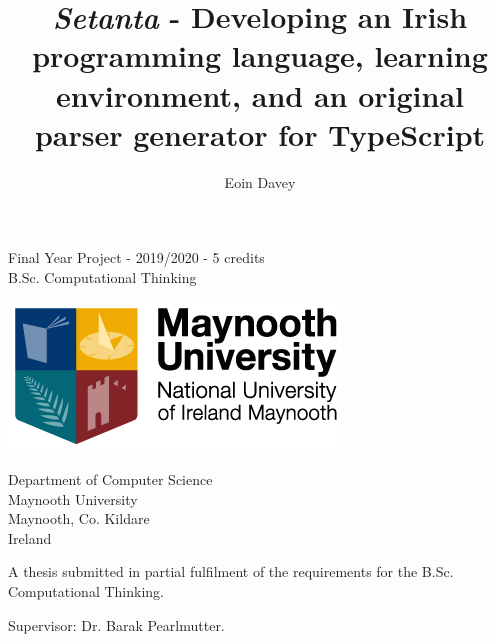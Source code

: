 \documentclass[11pt]{extarticle}
\newcommand{\Setanta}{\emph{Setanta}}
\begin{document}
    \title{
    \LARGE \textbf{\Setanta{} - Developing an Irish programming language, learning environment, and an original parser generator for TypeScript}\\
    }
    \author{\LARGE Eoin Davey}
    \date{}
    
    \maketitle

    \begin{center}
        \begin{LARGE}
        Final Year Project - 2019/2020 - 5 credits\\
        B.Sc. Computational Thinking\\

        \vspace{10mm}

        \includegraphics[scale=0.66]{src/maynoothlogo}

        \vspace{25mm}

        Department of Computer Science\\
        Maynooth University\\
        Maynooth, Co. Kildare\\
        Ireland
        \end{LARGE}

        \vspace{20mm}

        \begin{large}A thesis submitted in partial fulfilment of the requirements for the B.Sc. Computational Thinking.\end{large}

        \begin{LARGE}Supervisor: Dr. Barak Pearlmutter.\end{LARGE}
    \end{center}
    \clearpage
    \tableofcontents
\end{document}
